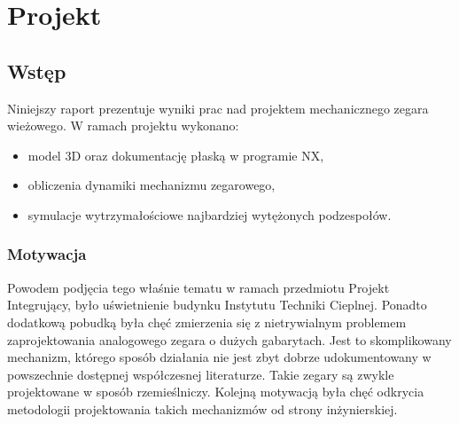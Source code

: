 \chapter{Projekt}
    \section{Wstęp}
    Niniejszy raport prezentuje wyniki prac nad projektem mechanicznego zegara wieżowego.
    W ramach projektu wykonano:
   \begin{itemize}
   	\item model 3D oraz dokumentację płaską w programie NX,
   	\item obliczenia dynamiki mechanizmu zegarowego,
   	\item symulacje wytrzymałościowe najbardziej wytężonych podzespołów.
   \end{itemize}
	
	
        \subsection{Motywacja}
        Powodem podjęcia tego właśnie tematu w ramach przedmiotu Projekt Integrujący, było uświetnienie budynku Instytutu Techniki Cieplnej.
        Ponadto dodatkową pobudką była chęć zmierzenia się z nietrywialnym problemem zaprojektowania analogowego zegara o dużych gabarytach.
        Jest to skomplikowany mechanizm, którego sposób działania nie jest zbyt dobrze udokumentowany w powszechnie dostępnej współczesnej literaturze. Takie zegary są zwykle projektowane w sposób rzemieślniczy. Kolejną motywacją była chęć odkrycia metodologii projektowania takich mechanizmów od strony inżynierskiej.

